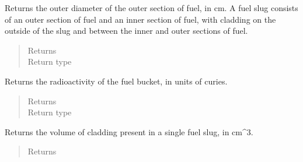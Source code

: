 \documentclass[letterpaper,10pt,openany,oneside,english]{sphinxmanual}
\begin{document}
\begin{fulllineitems}
\begin{fulllineitems}
\label{\detokenize{support_rst/fuel_bucket:fuel_bucket.FuelBucket.get_outer_slug_od}}
Returns the outer diameter of the outer section of fuel, in cm. A fuel
slug consists of an outer section of fuel and an inner section of fuel,
with cladding on the outside of the slug and between the inner and
outer sections of fuel.
\begin{quote}\begin{description}
\item[{Returns}] \leavevmode
{}

\item[{Return type}] \leavevmode
{}

\end{description}\end{quote}

\end{fulllineitems}


\begin{fulllineitems}
\label{\detokenize{support_rst/fuel_bucket:fuel_bucket.FuelBucket.get_radioactivity}}
Returns the radioactivity of the fuel bucket, in units of curies.
\begin{quote}\begin{description}
\item[{Returns}] \leavevmode
{}

\item[{Return type}] \leavevmode
{}

\end{description}\end{quote}

\end{fulllineitems}


\begin{fulllineitems}
\label{\detokenize{support_rst/fuel_bucket:fuel_bucket.FuelBucket.get_slug_cladding_volume}}
Returns the volume of cladding present in a single fuel slug, in cm\textasciicircum{}3.
\begin{quote}\begin{description}
\item[{Returns}] \leavevmode
{}


\end{description}
\end{quote}
\end{fulllineitems}
\end{fulllineitems}
\end{document}
